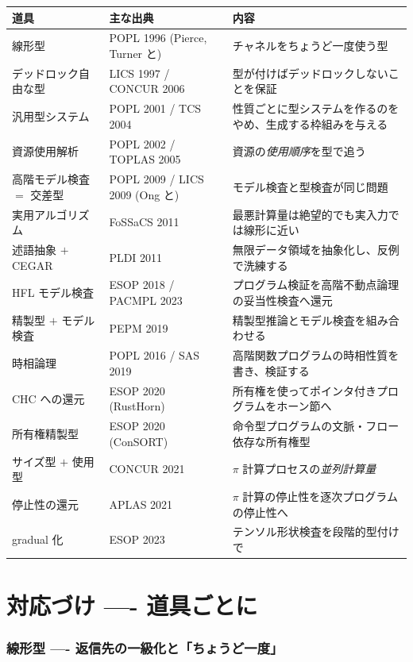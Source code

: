 \documentclass[11pt,a4paper]{ltjsarticle}
\theoremstyle{remark}
\begin{document}
\begin{center}
\small
\begin{tabular}{@{}llp{6.4cm}@{}}
\toprule
道具 & 主な出典 & 内容 \\
\midrule
線形型 & POPL 1996 (Pierce, Turner と) &
  チャネルをちょうど一度使う型 \\
デッドロック自由な型 & LICS 1997 / CONCUR 2006 &
  型が付けばデッドロックしないことを保証 \\
汎用型システム & POPL 2001 / TCS 2004 &
  性質ごとに型システムを作るのをやめ、生成する枠組みを与える \\
資源使用解析 & POPL 2002 / TOPLAS 2005 &
  資源の\emph{使用順序}を型で追う \\
高階モデル検査 $=$ 交差型 & POPL 2009 / LICS 2009 (Ong と) &
  モデル検査と型検査が同じ問題 \\
実用アルゴリズム & FoSSaCS 2011 &
  最悪計算量は絶望的でも実入力では線形に近い \\
述語抽象 $+$ CEGAR & PLDI 2011 &
  無限データ領域を抽象化し、反例で洗練する \\
HFL モデル検査 & ESOP 2018 / PACMPL 2023 &
  プログラム検証を高階不動点論理の妥当性検査へ還元 \\
精製型 $+$ モデル検査 & PEPM 2019 &
  精製型推論とモデル検査を組み合わせる \\
時相論理 & POPL 2016 / SAS 2019 &
  高階関数プログラムの時相性質を書き、検証する \\
CHC への還元 & ESOP 2020 (RustHorn) &
  所有権を使ってポインタ付きプログラムをホーン節へ \\
所有権精製型 & ESOP 2020 (ConSORT) &
  命令型プログラムの文脈・フロー依存な所有権型 \\
サイズ型 $+$ 使用型 & CONCUR 2021 &
  $\pi$ 計算プロセスの\emph{並列計算量} \\
停止性の還元 & APLAS 2021 &
  $\pi$ 計算の停止性を逐次プログラムの停止性へ \\
gradual 化 & ESOP 2023 &
  テンソル形状検査を段階的型付けで \\
\bottomrule
\end{tabular}
\end{center}

\part{対応づけ ---- 道具ごとに}

\section{線形型 ---- 返信先の一級化と「ちょうど一度」}
\end{document}
